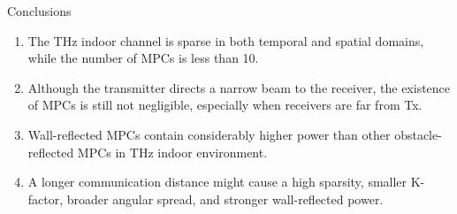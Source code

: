 \documentclass{beamer}
\begin{document}
\begin{frame}{Conclusions}
\begin{enumerate}
    \item The THz indoor channel is sparse in both temporal and spatial domains, while the number of MPCs is less than 10.
    \item Although the transmitter directs a narrow beam to the receiver, the existence of MPCs is still not negligible, especially when receivers are far from Tx.
    \item Wall-reflected MPCs contain considerably higher power than other obstacle-reflected MPCs in THz indoor environment.
    \item A longer communication distance might cause a high sparsity, smaller K-factor, broader angular spread, and stronger wall-reflected power.
\end{enumerate}
\end{frame}
\end{document}
